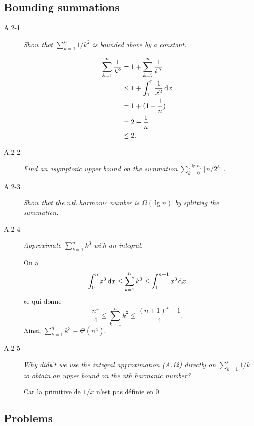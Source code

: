   \subsection{Bounding summations}

  \begin{description}
    \item[A.2-1] {\itshape Show that $\sum_{k=1}^n 1/k^2$ is bounded above by a constant.}
      \begin{ex}
      \begin{align*}
        \sum_{k=1}^n\frac{1}{k^2} &= 1 + \sum_{k=2}^n\frac{1}{k^2}\\
        &\le 1 + \int_1^n\frac{1}{x^2}\mathop{}\!\mathrm{d} x\\
        &= 1 + (1-\frac{1}{n})\\
        &= 2 - \frac{1}{n}\\
        &\le 2.
      \end{align*}
    \end{ex}
    \item[A.2-2]{\itshape Find an asymptotic upper bound on the summation $\sum\limits_{k=0}^{\lfloor \lg n \rfloor}\lceil n/2^k \rceil$.}

    \item[A.2-3] {\itshape Show that the $n$th harmonic number is $\Omega(\lg n)$ by splitting the summation.}

    \item[A.2-4]{\itshape Approximate $\sum_{k=1}^nk^3$ with an integral.}
        \begin{ex}
      On a
      $$\int_0^nx^3\mathop{}\!\mathrm{d} x \le \sum_{k=1}^nk^3 \le \int_1^{n+1}x^3\mathop{}\!\mathrm{d} x$$ ce qui donne $$\frac{n^4}{4} \le \sum_{k=1}^nk^3 \le \frac{(n+1)^4-1}{4}.$$ Ainsi, $\sum_{k=1}^nk^3 = \Theta(n^4)$.
    \end{ex}

  \item[A.2-5] {\itshape Why didn’t we use the integral approximation (A.12) directly on $\sum_{k=1}^n1/k$ to obtain an upper bound on the {\itshape n}th harmonic number?}
    \begin{ex}
      Car la primitive de $1/x$ n'est pas d\'efinie en $0$.
    \end{ex}

  \end{description}

  \subsection{Problems}

